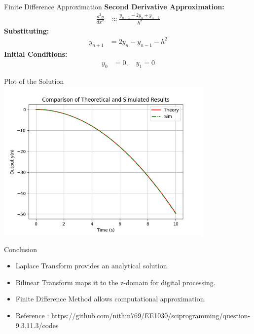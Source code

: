 \documentclass{beamer}
\begin{document}
\begin{frame}{Finite Difference Approximation}
	\textbf{Second Derivative Approximation:}
	\begin{align}
		\frac{d^2y}{dx^2} &\approx \frac{y_{n+1} - 2y_n + y_{n-1}}{h^2}
	\end{align}
	\textbf{Substituting:}
	\begin{align}
		y_{n+1} &= 2y_n - y_{n-1} - h^2
	\end{align}
	\textbf{Initial Conditions:}
	\begin{align}
		y_0 &= 0, \quad y_1 = 0
	\end{align}
\end{frame}

\begin{frame}{Plot of the Solution}
	\centering
	\includegraphics[width=0.8\textwidth]{figs/fig.png}
\end{frame}

\begin{frame}{Conclusion}
	\begin{itemize}
		\item Laplace Transform provides an analytical solution.
		\item Bilinear Transform maps it to the z-domain for digital processing.
		\item Finite Difference Method allows computational approximation.
		\item \footnotesize Reference : https://github.com/nithin769/EE1030/sciprogramming/question-9.3.11.3/codes
	\end{itemize}
\end{frame}
\end{document}
